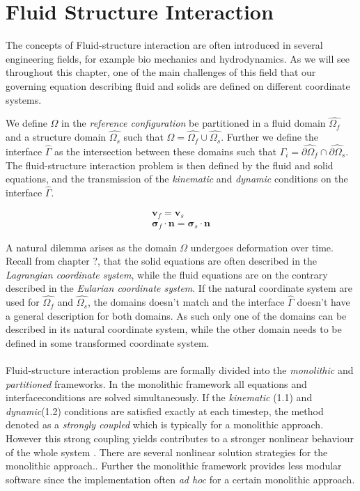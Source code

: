 \chapter{Fluid Structure Interaction}


The concepts of Fluid-structure interaction are often introduced in several engineering fields, for example bio mechanics and hydrodynamics. As we will see throughout this chapter, one of the main challenges of this field that our governing equation describing fluid and solids are defined on different coordinate systems. 

We define $\Omega$ in the \textit{reference configuration} be partitioned in a fluid domain $\hat{\Omega_f}$ and a structure domain $\hat{\Omega_s}$ such that
$\Omega = \hat{\Omega_f} \cup \hat{\Omega_s}$. Further we define the interface $\hat{\Gamma}$ as the intersection between these domains such that $\Gamma_i = \hat{\partial \Omega_f} \cap \hat{\partial \Omega_s}$. 
The fluid-structure interaction problem is then defined by the fluid and solid equations, and the transmission of the \textit{kinematic} and \textit{dynamic} conditions on the interface $\hat{\Gamma}$. 

\begin{align}
\mathbf{v}_f = \mathbf{v}_s \\
\mathbf{\sigma}_f \cdot \mathbf{n} = \mathbf{\sigma}_s \cdot \mathbf{n}
\end{align}

 A natural dilemma arises as the domain $\Omega$ undergoes deformation over time. Recall from chapter ?, that the solid equations are often described in the \textit{Lagrangian coordinate system}, while the fluid equations are on the contrary described in the \textit{Eularian coordinate system}. If the natural coordinate system are used for $\hat{\Omega_f}$ and $\hat{\Omega_s}$, the domains doesn't match and the interface $\hat{\Gamma}$ doesn't have a general description for both domains. As such only one of the domains can be described in its natural coordinate system, while the other domain needs to be defined in some transformed coordinate system. \\ \\

Fluid-structure interaction problems are formally divided into the \textit{monolithic} and \textit{partitioned} frameworks.  In the monolithic framework all equations and interfaceconditions are solved simultaneously. If the \textit{kinematic} (1.1) and \textit{dynamic}(1.2) conditions are satisfied exactly at each timestep, the method denoted as a \textit{strongly coupled} which is typically for a monolithic approach. However this strong coupling yields contributes to a stronger nonlinear behaviour of the whole system \cite{Wick}. There are several nonlinear solution strategies for the monolithic approach..
Further the monolithic framework provides less modular software since the implementation often \textit{ad hoc} for a certain monolithic approach. 

